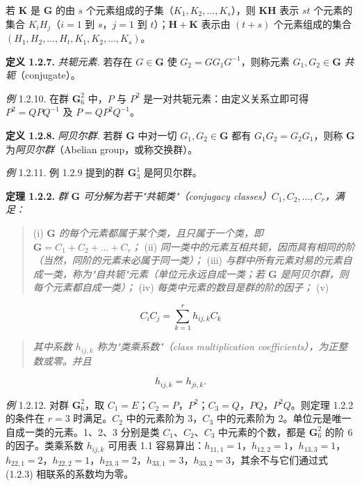若 $\mathbf{K}$ 是 $\mathbf{G}$ 的由 $s$ 个元素组成的子集（$K_{1}, K_{2}, \ldots, K_{s}$），则 $\mathbf{KH}$ 表示 $st$ 个元素的集合 $K_{i}H_{j}$（$i = 1$ 到 $s$，$j = 1$ 到 $t$）；$\mathbf{H} + \mathbf{K}$ 表示由 $(t+s)$ 个元素组成的集合 $(H_{1}, H_{2}, \ldots, H_{t}, K_{1}, K_{2}, \ldots, K_{s})$。

\textbf{定义 1.2.7.} \textit{共轭元素.} 若存在 $G \in \mathbf{G}$ 使 $G_{2} = GG_{1}G^{-1}$，则称元素 $G_{1}, G_{2} \in \mathbf{G}$ \textit{共轭}（conjugate）。

\textit{例} 1.2.10. 在群 $\mathbf{G}_6^2$ 中，$P$ 与 $P^{2}$ 是一对共轭元素：由定义关系立即可得 $P^{2} = QPQ^{-1}$ 及 $P = QP^{2}Q^{-1}$。

\textbf{定义 1.2.8.} \textit{阿贝尔群.} 若群 $\mathbf{G}$ 中对一切 $G_{1}, G_{2} \in \mathbf{G}$ 都有 $G_{1}G_{2} = G_{2}G_{1}$，则称 $\mathbf{G}$ 为\textit{阿贝尔群}（Abelian group，或称交换群）。

\textit{例} 1.2.11. 例 1.2.9 提到的群 $\mathbf{G}_3^1$ 是阿贝尔群。

\textbf{定理 1.2.2.} \textit{群 $\mathbf{G}$ 可分解为若干"共轭类"（conjugacy classes）$C_{1}, C_{2}, \ldots, C_{r}$，满足：}

\begin{quote}
(i) \textit{$\mathbf{G}$ 的每个元素都属于某个类，且只属于一个类，即 $\mathbf{G} = C_{1} + C_{2} + \ldots + C_{r}$；}
(ii) \textit{同一类中的元素互相共轭，因而具有相同的阶（当然，同阶的元素未必属于同一类）；}
(iii) \textit{与群中所有元素对易的元素自成一类，称为"自共轭"元素（单位元永远自成一类；若 $\mathbf{G}$ 是阿贝尔群，则每个元素都自成一类）；}
(iv) \textit{每类中元素的数目是群的阶的因子；}
(v)

\end{quote}
\begin{equation*}
C_{i}C_{j} = \sum_{k=1}^{r} h_{ij,k}C_{k} \tag{1.2.2}
\end{equation*}

\begin{quote}

\textit{其中系数 $h_{ij,k}$ 称为"类乘系数"（class multiplication coefficients），为正整数或零。并且}

\end{quote}
\begin{equation*}
h_{ij,k} = h_{ji,k}. \tag{1.2.3}
\end{equation*}

\textit{例} 1.2.12. 对群 $\mathbf{G}_6^2$，取 $C_{1} = E$；$C_{2} = P$，$P^{2}$；$C_{3} = Q$，$PQ$，$P^{2}Q$。则定理 1.2.2 的条件在 $r = 3$ 时满足。$C_{2}$ 中的元素阶为 3，$C_{3}$ 中的元素阶为 2。单位元是唯一自成一类的元素。1、2、3 分别是类 $C_{1}$、$C_{2}$、$C_{3}$ 中元素的个数，都是 $\mathbf{G}_6^2$ 的阶 6 的因子。类乘系数 $h_{ij,k}$ 可用表 1.1 容易算出：$h_{11,1} = 1$，$h_{12,2} = 1$，$h_{13,3} = 1$，$h_{22,1} = 2$，$h_{22,2} = 1$，$h_{23,3} = 2$，$h_{33,1} = 3$，$h_{33,2} = 3$，其余不与它们通过式 (1.2.3) 相联系的系数均为零。

